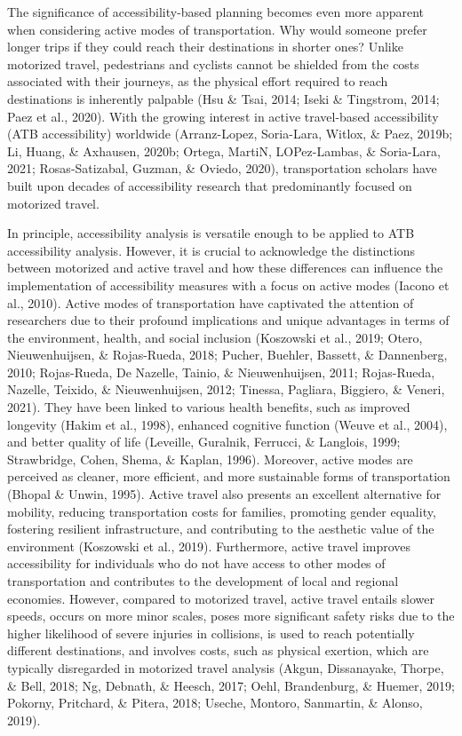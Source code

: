 \documentclass[
11pt, %
oneside, %
english, %
singlespacing, %
]{macthesis} %
\begin{document}
The significance of accessibility-based planning becomes even more apparent when considering active modes of transportation. Why would someone prefer longer trips if they could reach their destinations in shorter ones? Unlike motorized travel, pedestrians and cyclists cannot be shielded from the costs associated with their journeys, as the physical effort required to reach destinations is inherently palpable (Hsu \& Tsai, 2014; Iseki \& Tingstrom, 2014; Paez et al., 2020). With the growing interest in active travel-based accessibility (ATB accessibility) worldwide (Arranz-Lopez, Soria-Lara, Witlox, \& Paez, 2019b; Li, Huang, \& Axhausen, 2020b; Ortega, MartiN, LOPez-Lambas, \& Soria-Lara, 2021; Rosas-Satizabal, Guzman, \& Oviedo, 2020), transportation scholars have built upon decades of accessibility research that predominantly focused on motorized travel.

In principle, accessibility analysis is versatile enough to be applied to ATB accessibility analysis. However, it is crucial to acknowledge the distinctions between motorized and active travel and how these differences can influence the implementation of accessibility measures with a focus on active modes (Iacono et al., 2010). Active modes of transportation have captivated the attention of researchers due to their profound implications and unique advantages in terms of the environment, health, and social inclusion (Koszowski et al., 2019; Otero, Nieuwenhuijsen, \& Rojas-Rueda, 2018; Pucher, Buehler, Bassett, \& Dannenberg, 2010; Rojas-Rueda, De Nazelle, Tainio, \& Nieuwenhuijsen, 2011; Rojas-Rueda, Nazelle, Teixido, \& Nieuwenhuijsen, 2012; Tinessa, Pagliara, Biggiero, \& Veneri, 2021). They have been linked to various health benefits, such as improved longevity (Hakim et al., 1998), enhanced cognitive function (Weuve et al., 2004), and better quality of life (Leveille, Guralnik, Ferrucci, \& Langlois, 1999; Strawbridge, Cohen, Shema, \& Kaplan, 1996). Moreover, active modes are perceived as cleaner, more efficient, and more sustainable forms of transportation (Bhopal \& Unwin, 1995). Active travel also presents an excellent alternative for mobility, reducing transportation costs for families, promoting gender equality, fostering resilient infrastructure, and contributing to the aesthetic value of the environment (Koszowski et al., 2019). Furthermore, active travel improves accessibility for individuals who do not have access to other modes of transportation and contributes to the development of local and regional economies. However, compared to motorized travel, active travel entails slower speeds, occurs on more minor scales, poses more significant safety risks due to the higher likelihood of severe injuries in collisions, is used to reach potentially different destinations, and involves costs, such as physical exertion, which are typically disregarded in motorized travel analysis (Akgun, Dissanayake, Thorpe, \& Bell, 2018; Ng, Debnath, \& Heesch, 2017; Oehl, Brandenburg, \& Huemer, 2019; Pokorny, Pritchard, \& Pitera, 2018; Useche, Montoro, Sanmartin, \& Alonso, 2019).
\end{document}
